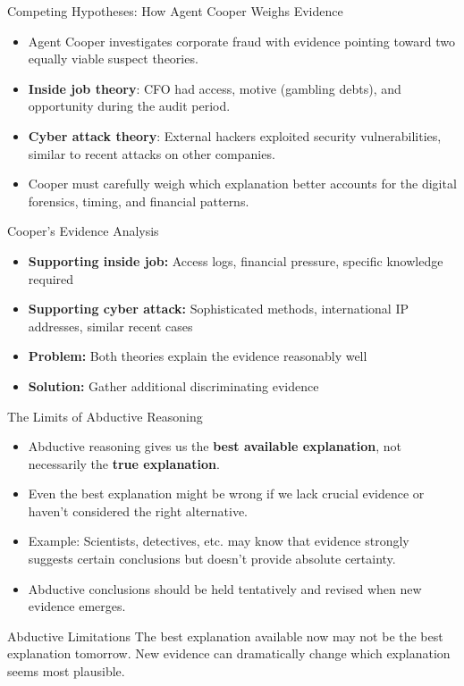 \documentclass{beamer}
\begin{document}
\begin{frame}{Competing Hypotheses: How Agent Cooper Weighs Evidence}
	\begin{itemize}
		\item Agent Cooper investigates corporate fraud with evidence pointing toward two equally viable suspect theories.
		\item \textbf{Inside job theory}: CFO had access, motive (gambling debts), and opportunity during the audit period.
		\item \textbf{Cyber attack theory}: External hackers exploited security vulnerabilities, similar to recent attacks on other companies.
		\item Cooper must carefully weigh which explanation better accounts for the digital forensics, timing, and financial patterns.
	\end{itemize}
	
	\begin{block}{Cooper's Evidence Analysis}
		\scriptsize
		\begin{itemize}
			\item \textbf{Supporting inside job:} Access logs, financial pressure, specific knowledge required
			\item \textbf{Supporting cyber attack:} Sophisticated methods, international IP addresses, similar recent cases
			\item \textbf{Problem:} Both theories explain the evidence reasonably well
			\item \textbf{Solution:} Gather additional discriminating evidence
		\end{itemize}
	\end{block}
\end{frame}

\begin{frame}{The Limits of Abductive Reasoning}
	\begin{itemize}
		\item Abductive reasoning gives us the \textbf{best available explanation}, not necessarily the \textbf{true explanation}.
		\item Even the best explanation might be wrong if we lack crucial evidence or haven't considered the right alternative.
		\item Example: Scientists, detectives, etc. may know that evidence strongly suggests certain conclusions but doesn't provide absolute certainty.
		\item Abductive conclusions should be held tentatively and revised when new evidence emerges.
	\end{itemize}
	
	\begin{alertblock}{Abductive Limitations}
		The best explanation available now may not be the best explanation tomorrow. New evidence can dramatically change which explanation seems most plausible.
	\end{alertblock}
\end{frame}
\end{document}
